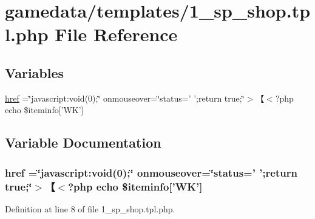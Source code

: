 \hypertarget{1__sp__shop_8tpl_8php}{\section{gamedata/templates/1\+\_\+sp\+\_\+shop.tpl.\+php File Reference}
\label{1__sp__shop_8tpl_8php}
}
\subsection*{Variables}
\begin{DoxyCompactItemize}
\item 
\hyperlink{1__sp__shop_8tpl_8php_aecfca4286e302d5d945be6fe76b99c86}{href} =\char`\"{}javascript\+:void(0);\char`\"{} onmouseover=\char`\"{}status=' ';return true;\char`\"{}$>$【$<$?php echo \$iteminfo\mbox{[}'W\+K'\mbox{]}
\end{DoxyCompactItemize}


\subsection{Variable Documentation}
\hypertarget{1__sp__shop_8tpl_8php_aecfca4286e302d5d945be6fe76b99c86}{
\subsubsection[{href}]{\setlength{\rightskip}{0pt plus 5cm}href =\char`\"{}javascript\+:void(0);\char`\"{} onmouseover=\char`\"{}status=' ';return true;\char`\"{}$>$【$<$?php echo \$iteminfo\mbox{[}'W\+K'\mbox{]}}}\label{1__sp__shop_8tpl_8php_aecfca4286e302d5d945be6fe76b99c86}


Definition at line 8 of file 1\+\_\+sp\+\_\+shop.\+tpl.\+php.

